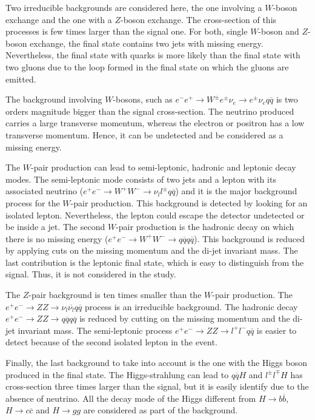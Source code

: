     Two irreducible backgrounds are considered here, the one involving a $W$-boson exchange and the one with a $Z$-boson exchange.
    The cross-section of this processes is few times larger than the signal one.
    For both, single $W$-boson and $Z$-boson exchange, the final state contains two jets with missing energy.
    Nevertheless, the final state with quarks is more likely than the final state with two gluons due to the loop formed in the final state on which the gluons are emitted.

    The background involving $W$-bosons, such as $e^{-}e^{+} \rightarrow W^{\pm}e^{\pm}\nu_{e} \rightarrow e^{\pm}\nu_{e}q\overline{q}$ is two orders magnitude bigger than the signal cross-section.
    The neutrino produced carries a large transverse momentum, whereas the electron or positron has a low transverse momentum.
    Hence, it can be undetected and be considered as a missing energy.
    
    The $W$-pair production can lead to semi-leptonic, hadronic and leptonic decay modes.
    The semi-leptonic mode consists of two jets and a lepton with its associated neutrino ($e^{+}e^{-} \rightarrow W^+W^- \rightarrow \nu_{l}l^{\pm}q\overline{q}$) and it is the major background process for the $W$-pair production.
    This background is detected by looking for an isolated lepton.
    Nevertheless, the lepton could escape the detector undetected or be inside a jet.
    The second $W$-pair production is the hadronic decay on which there is no missing energy ($e^{+}e^{-} \rightarrow W^+W^- \rightarrow q\overline{q} q\overline{q}$).
    This background is reduced by applying cuts on the missing momentum and the di-jet invariant mass.
    The last contribution is the leptonic final state, which is easy to distinguish from the signal.
    Thus, it is not considered in the study. 

    The $Z$-pair background is ten times smaller than the $W$-pair production.
    The  $e^+e^- \rightarrow ZZ \rightarrow \nu_{l}\overline{\nu_{l}}q \overline{q}$ process is an irreducible background.
    The hadronic decay $e^+e^- \rightarrow ZZ \rightarrow q\overline{q} q\overline{q}$ is reduced by cutting on the missing momentum and the di-jet invariant mass.
    The semi-leptonic process $e^+e^- \rightarrow ZZ \rightarrow l^+l^- q\overline{q}$ is easier to detect because of the second isolated lepton in the event.

    Finally, the last background to take into account is the one with the Higgs boson produced in the final state.
    The Higgs-strahlung can lead to $q\overline{q}H$ and $l^{\pm}l^{\mp}H$ has cross-section three times larger than the signal, but it is easily identify due to the absence of neutrino.
    All the decay mode of the Higgs different from $H \rightarrow b\overline{b}$, $H \rightarrow c\overline{c}$ and $H \rightarrow gg$ are considered as part of the background.

